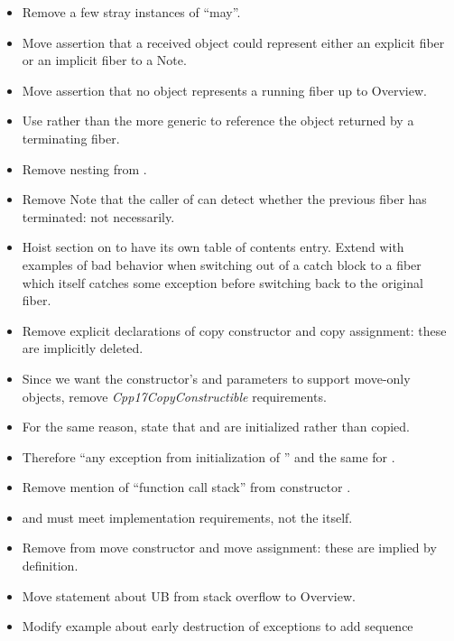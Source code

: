 \begin{itemize}
    \item Remove a few stray instances of ``may''.
    \item Move assertion that a received \fiber object could represent either
          an explicit fiber or an implicit fiber to a Note.
    \item Move assertion that no \fiber object represents a running fiber up
          to Overview.
    \item Use  rather than the more generic 
          to reference the \fiber object returned by a terminating fiber.
    \item Remove nesting from \resumewith \except.
    \item Remove Note that the caller of \resumewith can detect whether the
          previous fiber has terminated: not necessarily.
    \item Hoist section on \exfns to have its own table of contents entry.
          Extend with examples of bad behavior when switching out of a catch
          block to a fiber which itself catches some exception before
          switching back to the original fiber.
    \item Remove explicit  declarations of copy constructor and
          copy assignment: these are implicitly deleted.
    \item Since we want the constructor's  and 
          parameters to support move-only objects,
          remove \emph{Cpp17CopyConstructible} requirements.
    \item For the same reason, state that 
          and  are initialized rather than copied.
    \item Therefore ``any exception from initialization of ''
          and the same for .
    \item Remove mention of ``function call stack'' from constructor \except.
    \item {} and  must meet implementation
          requirements, not the  itself.
    \item Remove \postcond {} from move constructor and
          move assignment: these are implied by definition.
    \item Move statement about UB from stack overflow to \fiber Overview.
    \item Modify example about early destruction of exceptions to add sequence

\end{itemize}
